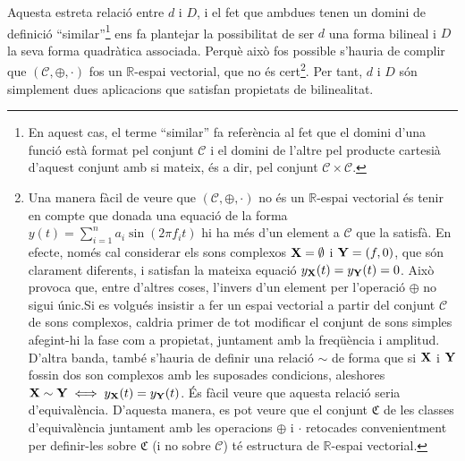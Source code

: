 \documentclass{article}
\theoremstyle{math}
\theoremstyle{TheoremNum}
\newcommand{\0}{\ensuremath{\vb{0}}}
\newcommand{\X}{\ensuremath{\vb{X}}}
\newcommand{\Y}{\ensuremath{\vb{Y}}}
\newcommand{\RR}{\ensuremath{\mathbb{R}}} %
\begin{document}
Aquesta estreta relació entre $d$ i $D$, i el fet que ambdues tenen un domini de definició ``similar''\footnote{En aquest cas, el terme ``similar'' fa referència al fet que el domini d'una funció està format pel conjunt $\mathcal{C}$ i el domini de l'altre pel producte cartesià d'aquest conjunt amb si mateix, és a dir, pel conjunt $\mathcal{C}\times\mathcal{C}$.} ens fa plantejar la possibilitat de ser $d$ una forma bilineal i $D$ la seva forma quadràtica associada. Perquè això fos possible s'hauria de complir que $(\mathcal{C},\oplus,\cdot)$ fos un $\RR$-espai vectorial, que no és cert\footnote{Una manera fàcil de veure que $(\mathcal{C},\oplus,\cdot)$ no és un $\RR$-espai vectorial és tenir en compte que donada una equació de la forma $y(t)=\sum_{i=1}^na_i\sin(2\pi f_it)$ hi ha més d'un element a $\mathcal{C}$ que la satisfà. En efecte, només cal considerar els sons complexos $\X=\emptyset$ i $\Y=(f,0)$, que són clarament diferents, i satisfan la mateixa equació $y_{\X}(t)=y_{\Y}(t)=0$. Això provoca que, entre d'altres coses, l'invers d'un element per l'operació $\oplus$ no sigui únic.\newline Si es volgués insistir a fer un espai vectorial a partir del conjunt $\mathcal{C}$ de sons complexos, caldria primer de tot modificar el conjunt de sons simples afegint-hi la fase com a propietat, juntament amb la freqüència i amplitud. D'altra banda, també s'hauria de definir una relació $\sim$ de forma que si $\X$ i $\Y$ fossin dos son complexos amb les suposades condicions, aleshores $\X\sim \Y\iff y_{\X}(t)=y_{\Y}(t)$. És fàcil veure que aquesta relació seria d'equivalència. D'aquesta manera, es pot veure que el conjunt $\mathfrak{C}$ de les classes d'equivalència juntament amb les operacions $\oplus$ i $\cdot$ retocades convenientment per definir-les sobre $\mathfrak{C}$ (i no sobre $\mathcal{C}$) té estructura de $\RR$-espai vectorial.}. Per tant, $d$ i $D$ són simplement dues aplicacions que satisfan propietats de bilinealitat.
\end{document}

